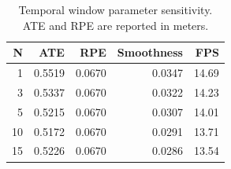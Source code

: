 \begin{table}[t]
\centering
\caption{Temporal window parameter sensitivity. ATE and RPE are reported in meters.}
\label{tab:parameter_sensitivity_final}
\begin{tabular}{rrrrr}
\toprule
N & ATE & RPE & Smoothness & FPS \\
\midrule
1 & 0.5519 & 0.0670 & 0.0347 & 14.69 \\
3 & 0.5337 & 0.0670 & 0.0322 & 14.23 \\
5 & 0.5215 & 0.0670 & 0.0307 & 14.01 \\
10 & 0.5172 & 0.0670 & 0.0291 & 13.71 \\
15 & 0.5226 & 0.0670 & 0.0286 & 13.54 \\
\bottomrule
\end{tabular}
\end{table}
